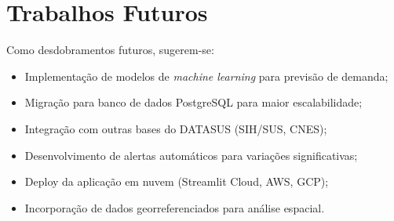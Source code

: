 \documentclass[
    12pt,
    oneside,
    a4paper,
    chapter=TITLE,
    section=TITLE
]{abntex2}
\begin{document}
\section{Trabalhos Futuros}

Como desdobramentos futuros, sugerem-se:

\begin{itemize}
    \item Implementação de modelos de \textit{machine learning} para previsão de demanda;
    \item Migração para banco de dados PostgreSQL para maior escalabilidade;
    \item Integração com outras bases do DATASUS (SIH/SUS, CNES);
    \item Desenvolvimento de alertas automáticos para variações significativas;
    \item Deploy da aplicação em nuvem (Streamlit Cloud, AWS, GCP);
    \item Incorporação de dados georreferenciados para análise espacial.
\end{itemize}


\postextual

\end{document}
